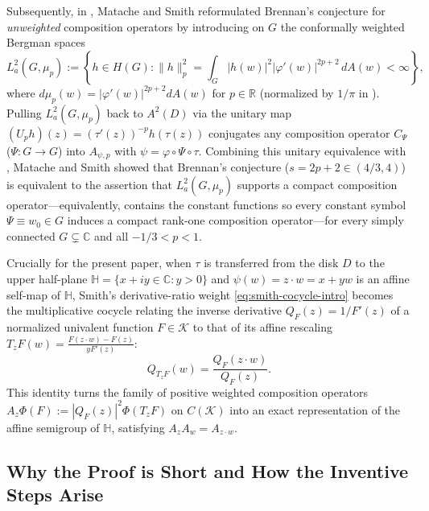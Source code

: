\documentclass[12pt]{article}
\def\R{\mathbb{R}}
\def\C{\mathbb{C}}
\def\H{\mathbb{H}}
\def\K{\mathcal{K}}
\theoremstyle{definition}
\numberwithin{equation}{section}
\begin{document}
Subsequently, in \cite{MS12}, Matache and Smith reformulated Brennan's conjecture for \emph{unweighted} composition operators by introducing on $G$ the conformally weighted Bergman spaces
\begin{equation}\label{eq:MS-space}
  L^2_a(G, \mu_p) := \left\{h \in H(G) : \|h\|_{p}^2 = \int_G |h(w)|^2 |\varphi'(w)|^{2p+2} \, dA(w) < \infty\right\},
\end{equation}
where $d\mu_p(w) = |\varphi'(w)|^{2p+2} dA(w)$ for $p \in \R$ (normalized by $1/\pi$ in \cite{MS12}). Pulling $L^2_a(G, \mu_p)$ back to $A^2(D)$ via the unitary map $(U_p h)(z) = (\tau'(z))^{-p} h(\tau(z))$ conjugates any composition operator $C_\Psi$ ($\Psi : G \to G$) into $A_{\psi, p}$ with $\psi = \varphi \circ \Psi \circ \tau$. Combining this unitary equivalence with \cite[Theorem~1.1]{Smi06}, Matache and Smith showed \cite[Propositions~1 and~7]{MS12} that Brennan's conjecture ($s = 2p+2 \in (4/3, 4)$) is equivalent to the assertion that $L^2_a(G, \mu_p)$ supports a compact composition operator---equivalently, contains the constant functions so every constant symbol $\Psi \equiv w_0 \in G$ induces a compact rank-one composition operator---for every simply connected $G \subsetneq \C$ and all $-1/3 < p < 1$.

Crucially for the present paper, when $\tau$ is transferred from the disk $D$ to the upper half-plane $\H = \{x+iy \in \C : y > 0\}$ and $\psi(w) = z \cdot w = x + yw$ is an affine self-map of $\H$, Smith's derivative-ratio weight \eqref{eq:smith-cocycle-intro} becomes the multiplicative cocycle relating the inverse derivative $Q_F(z) = 1/F'(z)$ of a normalized univalent function $F \in \K$ to that of its affine rescaling $T_z F(w) = \frac{F(z\cdot w) - F(z)}{y F'(z)}$:
\begin{equation}\label{eq:halfplane-cocycle-intro}
  Q_{T_z F}(w) = \frac{Q_F(z \cdot w)}{Q_F(z)}.
\end{equation}
This identity turns the family of positive weighted composition operators $A_z \Phi(F) := |Q_F(z)|^2 \Phi(T_z F)$ on $C(\K)$ into an exact representation of the affine semigroup of $\H$, satisfying $A_z A_w = A_{z \cdot w}$.

\subsection{Why the Proof is Short and How the Inventive Steps Arise}
\end{document}
